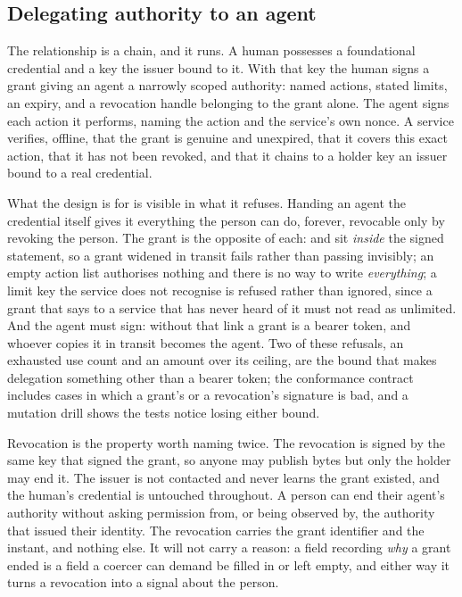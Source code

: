 \subsection{Delegating authority to an agent}

The relationship is a chain, and it runs. A human possesses a foundational credential and a key
the issuer bound to it. With that key the human signs a grant giving an agent a narrowly scoped
authority: named actions, stated limits, an expiry, and a revocation handle belonging to the grant
alone. The agent signs each action it performs, naming the action and the service's own nonce. A
service verifies, offline, that the grant is genuine and unexpired, that it covers this exact action,
that it has not been revoked, and that it chains to a holder key an issuer bound to a real
credential. \sImpl


What the design is for is visible in what it refuses. Handing an agent the credential itself gives it
everything the person can do, forever, revocable only by revoking the person. The grant is the
opposite of each:  and  sit \emph{inside} the signed statement, so a
grant widened in transit fails rather than passing invisibly; an empty action list authorises nothing
and there is no way to write \emph{everything}; a limit key the service does not recognise is
refused rather than ignored, since a grant that says  to a service that has
never heard of it must not read as unlimited. And the agent must sign: without that link a grant is a
bearer token, and whoever copies it in transit becomes the agent. Two of these refusals, an exhausted
use count and an amount over its ceiling, are the bound that makes delegation something other than a
bearer token; the conformance contract includes cases in which a grant's or a revocation's
signature is bad, and a mutation drill shows the tests notice losing either bound. \sImpl

Revocation is the property worth naming twice. The revocation is signed by the same key that signed
the grant, so anyone may publish bytes but only the holder may end it. The issuer is not contacted
and never learns the grant existed, and the human's credential is untouched throughout. A person can
end their agent's authority without asking permission from, or being observed by, the authority that
issued their identity. The revocation carries the grant identifier and the instant, and nothing else.
It will not carry a reason: a field recording \emph{why} a grant ended is a field a coercer can
demand be filled in or left empty, and either way it turns a revocation into a signal about the
person.

